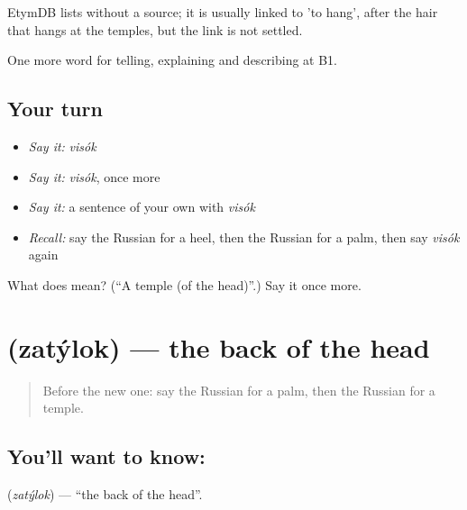 \begin{cousinweb}
EtymDB lists \emph{} without a source; it is usually linked to \emph{} 'to hang', after the hair that hangs at the temples, but the link is not settled.
\end{cousinweb}

\begin{grammarlens}[title={What you've built}]
One more word for telling, explaining and describing at B1.
\end{grammarlens}

\subsection*{Your turn}
\begin{itemize}
\raggedright
  \item \emph{Say it:} \emph{visók}
  \item \emph{Say it:} \emph{visók}, once more
  \item \emph{Say it:} a sentence of your own with \emph{visók}
  \item \emph{Recall:} say the Russian for a heel, then the Russian for a palm, then say \emph{visók} again
\end{itemize}

\begin{tcolorbox}[breakable,colback=teal!4,colframe=teal!35!black,title={Before you move on}]
What does  mean? (\textquotedblleft{}A temple (of the head)\textquotedblright{}.) Say it once more.
\end{tcolorbox}
\section[\texorpdfstring{\ru{затылок} (zatýlok)}{затылок (zatýlok)}]{ (zatýlok) — the back of the head}

\label{lesson:RU-C482-zatylok}



\begin{quote}
Before the new one: say the Russian for a palm, then the Russian for a temple.
\end{quote}

\subsection*{You'll want to know: }
\textbf{} (\emph{zatýlok}) — \textquotedblleft{}the back of the head\textquotedblright{}.

